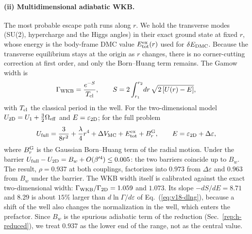 \paragraph{(ii) Multidimensional adiabatic WKB.}
The most probable escape path runs along $r$.
We hold the transverse modes (SU(2), hypercharge and the Higgs angles) in their exact ground state at fixed $r$, whose energy is the body-frame DMC value $E^{\rm ex}_{\rm tot}(r)$ used for $\delta E_{\rm DMC}$.
Because the transverse equilibrium stays at the origin as $r$ changes, there is no corner-cutting correction at first order, and only the Born--Huang term remains.
The Gamow width is
\begin{equation}
\Gamma_{\rm WKB}=\frac{e^{-S}}{T_{\rm cl}},\qquad S=2\int_{r_1}^{r_2}\!dr\,\sqrt{2\,[U(r)-E]},
\label{eq:v18-gamow}
\end{equation}
with $T_{\rm cl}$ the classical period in the well.
For the two-dimensional model $U_{\rm 2D}=U_1+\frac32\Omega_{\rm eff}$ and $E=\varepsilon_{\rm 2D}$; for the full problem
\begin{equation}
U_{\rm full}=\frac{3}{8r^2}+\frac\lambda4r^4+\Delta V_{\rm MC}+E^{\rm ex}_{\rm tot}+B_r^{\rm G},\qquad E=\varepsilon_{\rm 2D}+\Delta\varepsilon,
\label{eq:v18-Ufull}
\end{equation}
where $B_r^{\rm G}$ is the Gaussian Born--Huang term of the radial motion.
Under the barrier $U_{\rm full}-U_{\rm 2D}=B_w+O(\beta'^4)\le0.005$: the two barriers coincide up to $B_w$. %
The result, $\rho=0.937$ at both couplings, factorizes into $0.973$ from $\Delta\varepsilon$ and $0.963$ from $B_w$ under the barrier. %
The WKB width itself is calibrated against the exact two-dimensional width: $\Gamma_{\rm WKB}/\Gamma_{\rm 2D}=1.059$ and $1.073$. %
Its slope $-dS/dE=8.71$ and $8.29$ is about $15\%$ larger than $d\ln\Gamma/d\varepsilon$ of Eq.~(\ref{eq:v18-dlng}), because a shift of the well also changes the normalization in the well, which enters the prefactor. %
Since $B_w$ is the spurious adiabatic term of the reduction (Sec.~\ref{rep:h-reduced}), we treat $0.937$ as the lower end of the range, not as the central value.

